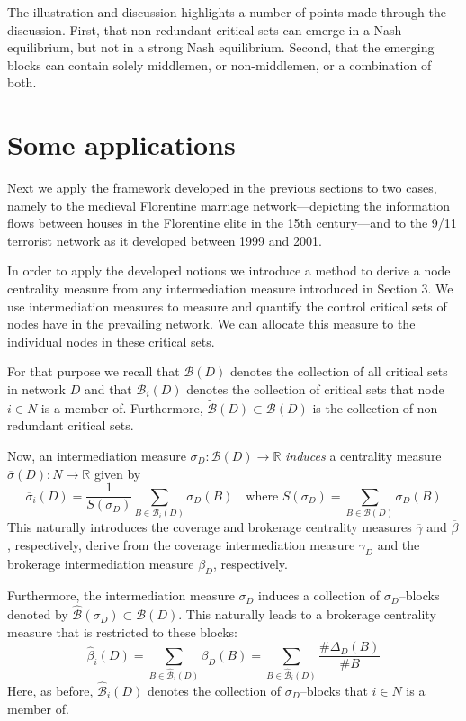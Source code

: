 The illustration and discussion highlights a number of points made through the discussion. First, that non-redundant critical sets can emerge in a Nash equilibrium, but not in a strong Nash equilibrium. Second, that the emerging blocks can contain solely middlemen, or non-middlemen, or a combination of both.

\section{Some applications}

Next we apply the framework developed in the previous sections to two cases, namely to the medieval Florentine marriage network---depicting the information flows between houses in the Florentine elite in the 15th century---and to the 9/11 terrorist network as it developed between 1999 and 2001.

In order to apply the developed notions we introduce a method to derive a node centrality measure from any intermediation measure introduced in Section 3. We use intermediation measures to measure and quantify the control critical sets of nodes have in the prevailing network. We can allocate this measure to the individual nodes in these critical sets.

For that purpose we recall that $\mathcal{B} (D)$ denotes the collection of all critical sets in network $D$ and that $\mathcal{B}_i (D)$ denotes the collection of critical sets that node $i \in N$ is a member of. Furthermore, $\widetilde{\mathcal{B}} (D) \subset \mathcal{B} (D)$ is the collection of non-redundant critical sets.

Now, an intermediation measure $\sigma_D \colon \mathcal{B} (D) \to \mathbb{R}$ \emph{induces} a centrality measure $\overline{\sigma} (D) \colon N \to \mathbb{R}$ given by
\begin{equation}
\overline{\sigma}_i (D) = \frac{1}{S (\sigma_D)} \sum_{B \in \mathcal{B}_i (D)} \sigma_D (B) \quad \mbox{where } S(\sigma_D) = \sum_{B \in \mathcal{B} (D)} \sigma_D (B)
\end{equation}
This naturally introduces the coverage and brokerage centrality measures $\overline{\gamma}$ and $\overline{\beta}$, respectively, derive from the coverage intermediation measure $\gamma_D$ and the brokerage intermediation measure $\beta_D$, respectively.

Furthermore, the intermediation measure $\sigma_D$ induces a collection of $\sigma_D$--blocks denoted by $\widehat{\mathcal{B}} (\sigma_D) \subset \mathcal{B} (D)$. This naturally leads to a brokerage centrality measure that is restricted to these blocks:
\begin{equation}
\widehat{\beta}_i (D) = \sum_{B \in \widehat{\mathcal{B}}_i (D)} \beta_D (B) =  \sum_{B \in \widehat{\mathcal{B}}_i (D)} \frac{\# \Delta_D (B)}{\# B}
\end{equation}
Here, as before, $\widehat{\mathcal{B}}_i (D)$ denotes the collection of $\sigma_D$--blocks that $i \in N$ is a member of.

